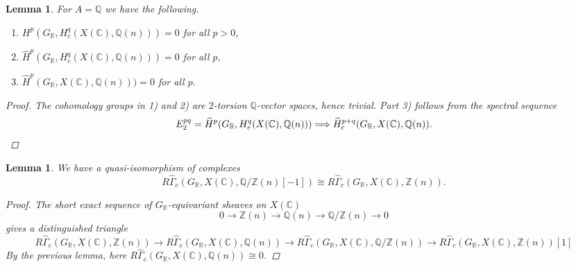 \documentclass{article}
\newcommand{\CC}{\mathbb{C}}
\newcommand{\QQ}{\mathbb{Q}}
\newcommand{\RR}{\mathbb{R}}
\newcommand{\ZZ}{\mathbb{Z}}
\newtheorem{lemma}[theorem]{Lemma}
\theoremstyle{definition}
\numberwithin{equation}{section}
\begin{document}
\begin{lemma}
  For $A = \QQ$ we have the following.

  \begin{enumerate}
  \item[1)] $H^p (G_\RR, H_c^q (X (\CC), \QQ (n))) = 0$ for all $p > 0$,

  \item[2)] $\widehat{H}^p (G_\RR, H_c^q (X (\CC), \QQ (n))) = 0$ for all $p$,

  \item[3)] $\widehat{H}^p (G_\RR, X (\CC), \QQ (n))) = 0$ for all $p$.
  \end{enumerate}

  \begin{proof}
    The cohomology groups in 1) and 2) are $2$-torsion $\QQ$-vector spaces,
    hence trivial. Part 3) follows from the spectral sequence
    \[ E_2^{pq} = \widehat{H}^p (G_\RR, H^q_c (X (\CC), \QQ (n)))
    \Longrightarrow
    \widehat{H}^{p+q}_c (G_\RR, X (\CC), \QQ (n)). \qedhere \]
  \end{proof}
\end{lemma}

\begin{lemma}
  We have a quasi-isomorphism of complexes
  \[ R\widehat{\Gamma}_c (G_\RR, X (\CC), \QQ/\ZZ (n) [-1]) \cong
  R\widehat{\Gamma}_c (G_\RR, X (\CC), \ZZ (n)).\]

  \begin{proof}
    The short exact sequence of $G_\RR$-equivariant sheaves on $X (\CC)$
    $$0 \to \ZZ (n) \to \QQ (n) \to \QQ/\ZZ (n) \to 0$$
    gives a distinguished triangle
    \[ R\widehat{\Gamma}_c (G_\RR, X (\CC), \ZZ (n)) \to
    R\widehat{\Gamma}_c (G_\RR, X (\CC), \QQ (n)) \to
    R\widehat{\Gamma}_c (G_\RR, X (\CC), \QQ/\ZZ (n)) \to
    R\widehat{\Gamma}_c (G_\RR, X (\CC), \ZZ (n)) [1] \]
    By the previous lemma, here
    $R\widehat{\Gamma}_c (G_\RR, X (\CC), \QQ (n)) \cong 0$.
  \end{proof}
\end{lemma}
\end{document}
